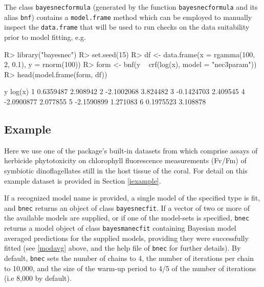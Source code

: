 \documentclass[
  shortnames]{jss}
\begin{document}
The class \texttt{bayesnecformula} (generated by the function \texttt{bayesnecformula} and its alias \texttt{bnf}) contains a \texttt{model.frame} method which can be employed to manually inspect the \texttt{data.frame} that will be used to run checks on the data suitability prior to model fitting, e.g.

\begin{CodeChunk}
\begin{CodeInput}
R> library("bayesnec")
R> set.seed(15)
R> df <- data.frame(x = rgamma(100, 2, 0.1), y = rnorm(100))
R> form <- bnf(y ~ crf(log(x), model = "nec3param"))
R> head(model.frame(form, df))
\end{CodeInput}
\begin{CodeOutput}
           y   log(x)
1  0.6359487 2.908942
2 -2.1002068 3.824482
3 -0.1424703 2.409545
4 -2.0900877 2.077855
5 -2.1590899 1.271083
6  0.1975523 3.108878
\end{CodeOutput}
\end{CodeChunk}

\newpage

\hypertarget{example}{%
\subsection{Example}\label{example}}

Here we use one of the package's built-in datasets from \citet{jones2003meps} which comprise assays of herbicide phytotoxicity on chlorophyll fluorescence measurements (Fv/Fm) of symbiotic dinoflagellates still in the host tissue of the coral. For detail on this example dataset is provided in Section \ref{iexample}.

\begin{CodeChunk}
\end{CodeChunk}

If a recognized model name is provided, a single model of the specified type is fit, and \texttt{bnec} returns an object of class \texttt{bayesnecfit}. If a vector of two or more of the available models are supplied, or if one of the model-sets is specified, \texttt{bnec} returns a model object of class \texttt{bayesmanecfit} containing Bayesian model averaged predictions for the supplied models, providing they were successfully fitted (see \ref{modavg} above, and the help file of \texttt{bnec} for further details). By default, \texttt{bnec} sets the number of chains to 4, the number of iterations per chain to 10,000, and the size of the warm-up period to 4/5 of the number of iterations (i.e 8,000 by default).
\end{document}
